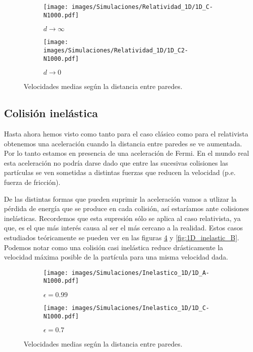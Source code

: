 \begin{figure}[!h]
    \begin{subfigure}[b]{0.5\textwidth}
        \centering
        \texttt{[image: images/Simulaciones/Relatividad\_1D/1D\_C-N1000.pdf]}
        \caption{$d \rightarrow \infty$}
        \label{fig:relatividad_1D_C}
    \end{subfigure}
    \hfill
    \begin{subfigure}[b]{0.5\textwidth}
        \centering
        \texttt{[image: images/Simulaciones/Relatividad\_1D/1D\_C2-N1000.pdf]}
        \caption{$d \rightarrow 0$}
        \label{fig:relatividad_1D_C2}
    \end{subfigure}
    \caption{Velocidades medias según la distancia entre paredes.}
\end{figure}

\subsection{Colisión inelástica}

Hasta ahora hemos visto como tanto para el caso clásico como para el relativista obtenemos una aceleración cuando la distancia entre paredes se ve aumentada. Por lo tanto estamos en presencia de una aceleración de Fermi. En el mundo real esta aceleración no podría darse dado que entre las sucesivas colisiones las partículas se ven sometidas a distintas fuerzas que reducen la velocidad (p.e. fuerza de fricción). 

\vspace{3mm}

De las distintas formas que pueden suprimir la aceleración vamos a utlizar la pérdida de energía que se produce en cada colisión, así estaríamos ante colisiones inelásticas. Recordemos que esta supresión sólo se aplica al caso relativista, ya que, es el que más interés causa al ser el más cercano a la realidad. Estos casos estudiados teóricamente se pueden ver en las figuras \ref{fig:1D_inelastic_A} y \ref{fig:1D_inelastic_B}. Podemos notar como una colisión casi inelástica reduce drásticamente la velocidad máxima posible de la partícula para una misma velocidad dada.


\begin{figure}[H]
    \begin{subfigure}[b]{0.5\textwidth}
        \centering
        \texttt{[image: images/Simulaciones/Inelastico\_1D/1D\_A-N1000.pdf]}
        \caption{$\epsilon = 0.99$}
    \end{subfigure}
    \hfill
    \begin{subfigure}[b]{0.5\textwidth}
        \centering
        \texttt{[image: images/Simulaciones/Inelastico\_1D/1D\_C-N1000.pdf]}
        \caption{$\epsilon = 0.7$}
    \end{subfigure}
    \caption{Velocidades medias según la distancia entre paredes.}
    \label{fig:1D_inelastic_A}
\end{figure}

